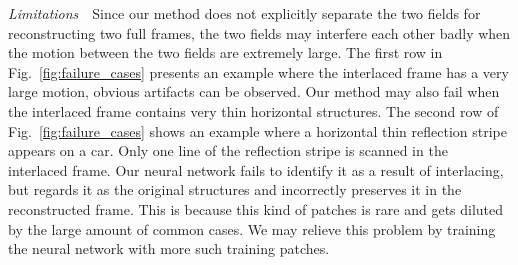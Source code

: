 \vspace{0.15in}
\noindent\emph{Limitations}\,\,\,\,
Since our method does not explicitly separate the two fields for reconstructing
two full frames, the two fields may interfere each other 
badly when the motion between the two fields are extremely large. The first row
in Fig.~\ref{fig:failure_cases} presents an example where the interlaced frame
has a very large motion, obvious artifacts can be
observed. Our method may also fail when the interlaced frame contains very thin
horizontal structures. The second row of Fig.~\ref{fig:failure_cases} shows an
example where a horizontal thin reflection stripe appears on a car. Only one line
of the reflection stripe is scanned in the interlaced frame. Our neural network
fails to identify it as a result of interlacing, but regards it as the original
structures and incorrectly preserves it in the reconstructed frame. This is
because this kind of patches is rare and gets diluted by the large amount of
common cases. We may relieve this problem by training the neural network with 
more such training patches. 


